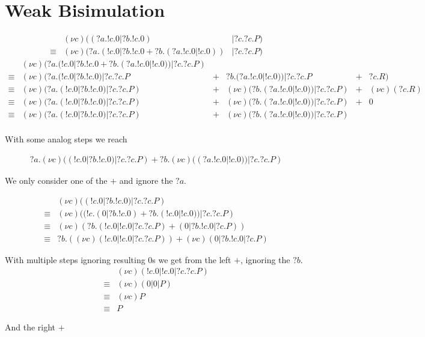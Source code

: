 \section{Weak Bisimulation}
\begin{align*}
& (\nu c)((?a.!c.0|?b.!c.0)&|?c.?c.P) \\
\equiv & (\nu c)(?a.(!c.0|?b.!c.0+?b.(?a.!c.0|!c.0))&|?c.?c.P)
\end{align*}
\begin{align*}
& (\nu c)(?a.(!c.0|?b.!c.0+?b.(?a.!c.0|!c.0))|?c.?c.P)&&&&\\
\equiv & (\nu c)(?a.(!c.0|?b.!c.0)|?c.?c.P&+& ?b.(?a.!c.0|!c.0))|?c.?c.P &+& ?c.R)\\
\equiv & (\nu c)(?a.(!c.0|?b.!c.0)|?c.?c.P)&+& (\nu c)(?b.(?a.!c.0|!c.0))|?c.?c.P) &+& (\nu c)(?c.R)\\
\equiv & (\nu c)(?a.(!c.0|?b.!c.0)|?c.?c.P)&+& (\nu c)(?b.(?a.!c.0|!c.0))|?c.?c.P) &+& 0\\
\equiv & (\nu c)(?a.(!c.0|?b.!c.0)|?c.?c.P)&+& (\nu c)(?b.(?a.!c.0|!c.0))|?c.?c.P) &&\\
\end{align*}

With some analog steps we reach

\begin{align*}
?a.(\nu c)((!c.0|?b.!c.0)|?c.?c.P)+?b.(\nu c)((?a.!c.0|!c.0))|?c.?c.P)
\end{align*}

We only consider one of the $+$ and ignore the $?a.$

\begin{align*}
&(\nu c)((!c.0|?b.!c.0)|?c.?c.P)\\
\equiv &(\nu c)((!c.(0|?b.!c.0)+?b.(!c.0|!c.0))|?c.?c.P)\\
\equiv &(\nu c)( ?b.(!c.0|!c.0|?c.?c.P) + (0|?b.!c.0|?c.P))\\
\equiv &?b.((\nu c)(!c.0|!c.0|?c.?c.P)) + (\nu c)(0|?b.!c.0|?c.P)
\end{align*}

With multiple steps ignoring resulting 0s we get from the left $+$, ignoring the $?b.$
\begin{align*}
&(\nu c)(!c.0|!c.0|?c.?c.P)\\
\equiv &(\nu c)(0|0|P)\\
\equiv &(\nu c) P\\
\equiv &P
\end{align*}

And the right $+$

